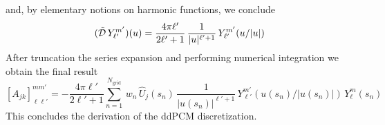 and, by elementary notions on harmonic functions, we conclude
\[
(\tilde{\mathcal{D}} \, Y_{\ell'}^{m'})(u) = \frac{4 \pi \ell'}{2 \ell' + 1} \, \frac{1}{|u|^{\ell' + 1}} \,  Y_{\ell'}^{m'}(u/|u|)
\]
After truncation the series expansion and performing numerical integration we obtain the final result
\begin{equation}\label{eq:ajk}
[A_{jk}]_{\ell \ell'}^{m m'} =-  \frac{4 \pi \ell'}{2 \ell' + 1}  \sum_{n=1}^{N_\text{grid}} \, w_n  \,  \hat{U}_j(s_n) \, \frac{1}{|u(s_n)|^{\ell' + 1}} \, Y_{\ell'}^{m'}(u(s_n)/|u(s_n)|) \, Y_{\ell}^{m}(s_n)
\end{equation}
This concludes the derivation of the ddPCM discretization.